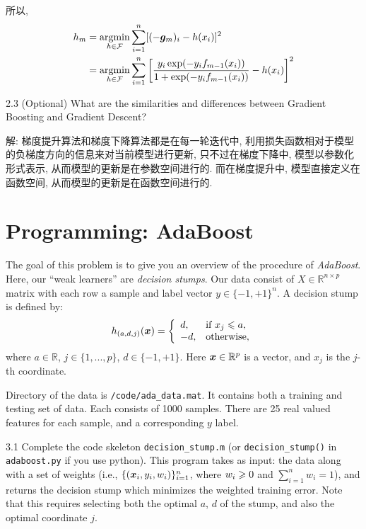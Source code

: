 \documentclass{article}
\begin{document}
所以,
\begin{equation}
  \begin{aligned}
    h_{m}
    &=\operatorname*{argmin}_{h\in\mathcal{F}}\sum_{i=1}^{n}[(-{\bm{g}}_{m})_{i}-h(x_{i})]^{2}\\
    &=\operatorname*{argmin}_{h\in\mathcal{F}}\sum_{i=1}^{n}\left[\frac{y_i\exp(-y_if_{m-1}(x_{i}))}{1+\exp(-y_if_{m-1}(x_{i}))}-h(x_{i})\right]^{2}\\
  \end{aligned}
\end{equation}

2.3 (Optional) What are the similarities and differences between Gradient Boosting and Gradient Descent?

解: 梯度提升算法和梯度下降算法都是在每一轮迭代中, 利用损失函数相对于模型的负梯度方向的信息来对当前模型进行更新, 只不过在梯度下降中, 模型以参数化形式表示, 从而模型的更新是在参数空间进行的. 而在梯度提升中, 模型直接定义在函数空间, 从而模型的更新是在函数空间进行的. 

\section*{Programming: AdaBoost}

The goal of this problem is to give you an overview of the procedure of \emph{AdaBoost}. Here, our ``weak learners'' are \emph{decision stumps}. Our data consist of $X \in \mathbb{R}^{n\times p}$ matrix with each row a sample and label vector $y\in\{-1, +1\}^{n}$. A decision stump is defined by:
\begin{equation}
  h_{(a,d,j)}(\bm{x})
  =\left\{\begin{array}{ll}
    d, & \text{if}\ x_{j}\leqslant a, \\
    -d, & \text{otherwise},
    \end{array} 
  \right.
\end{equation}
where $a\in \mathbb{R}$, $j\in \{1, ..., p\}$, $d\in \{-1, +1\}$. Here $\bm{x}\in \mathbb{R}^{p}$ is a vector, and $x_{j}$ is the $j$-th coordinate.

Directory of the data is \verb|/code/ada_data.mat|. It contains both a training and testing set of data. Each consists of 1000 samples. There are 25 real valued features for each sample, and a corresponding $y$ label.

3.1 Complete the code skeleton \verb|decision_stump.m| (or \verb|decision_stump()| in \verb|adaboost.py| if you use python). This program takes as input: the data along with a set of weights (i.e., $\{(\bm{x}_{i}, y_{i}, w_{i})\}_{i=1}^{n}$, where $w_{i} \geqslant 0$ and $\sum_{i=1}^{n}w_{i}=1$), and returns the decision stump which minimizes the weighted training error. Note that this requires selecting both the optimal $a$, $d$ of the stump, and also the optimal coordinate $j$.
\end{document}
